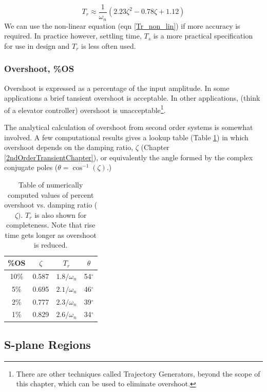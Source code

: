 \begin{equation}\label{Tr_non_lin}
T_r \approx \frac{1}{\omega_n}(2.23\zeta^2 - 0.78\zeta + 1.12)
\end{equation}
We can use the non-linear equation (eqn \ref{Tr_non_lin}) if more accuracy is required.
In practice however, settling time, $T_s$ is a more practical specification for use in design and $T_r$ is less often used.


\subsubsection{Overshoot, \%OS}

Overshoot is expressed as a percentage of the input amplitude.   In some applications a brief tansient overshoot is acceptable.  In other applications, (think of a elevator controller) overshoot is unacceptable\footnote{There are other techniques called Trajectory Generators, beyond the scope of this chapter, which can be used to eliminate overshoot.}.

The analytical calculation of overshoot from second order systems is somewhat involved.  A few computational results gives a lookup table (Table \ref{percentOStable}) in which overshoot depends on the damping ratio, $\zeta$ (Chapter \ref{2ndOrderTransientChapter}), or
equivalently the angle formed by the complex conjugate poles ($\theta = \cos^{-1}(\zeta)$.)

\begin{table}[h]\centering
\begin{tabular}{c|c|c|c}
	\%OS	& $\zeta$	& $T_r$          &   $\theta$	\\\hline
	10\%	& 0.587		& $1.8/\omega_n$ &  54$^\circ$	\\
	 5\%	& 0.695		& $2.1/\omega_n$ &  46$^\circ$	\\
	 2\%	& 0.777		& $2.3/\omega_n$ &  39$^\circ$	\\
	 1\%	& 0.829		& $2.6/\omega_n$ &  34$^\circ$	\\
\end{tabular}
\caption{Table of numerically computed values of percent overshoot vs. damping ratio ($\zeta)$.    $T_r$ is also shown for
completeness. Note that rise time gets longer as overshoot is reduced.}\label{percentOStable}
\end{table}

\subsection{S-plane Regions}

